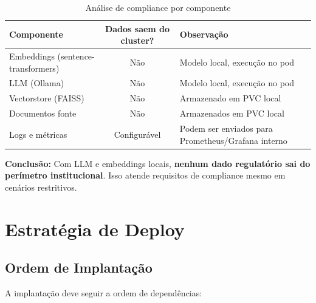 \documentclass[12pt, a4paper]{article}
\begin{document}
\begin{table}[H]
\centering
\small
\caption{Análise de compliance por componente}
\label{tab:compliance}
\begin{tabularx}{\textwidth}{l c X}
\toprule
\textbf{Componente} & \textbf{Dados saem do cluster?} & \textbf{Observação} \\
\midrule
Embeddings (sentence-transformers) & Não & Modelo local, execução no pod \\
LLM (Ollama) & Não & Modelo local, execução no pod \\
Vectorstore (FAISS) & Não & Armazenado em PVC local \\
Documentos fonte & Não & Armazenados em PVC local \\
Logs e métricas & Configurável & Podem ser enviados para Prometheus/Grafana interno \\
\bottomrule
\end{tabularx}
\end{table}

\noindent\textbf{Conclusão:} Com LLM e embeddings locais, \textbf{nenhum dado regulatório sai do perímetro institucional}. Isso atende requisitos de compliance mesmo em cenários restritivos.

\section{Estratégia de Deploy}

\subsection{Ordem de Implantação}

A implantação deve seguir a ordem de dependências:
\end{document}
